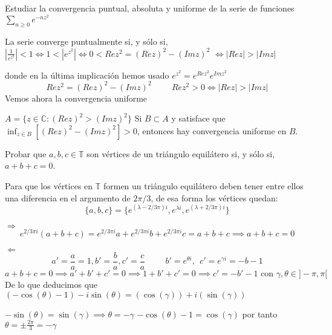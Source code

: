 \begin{ejer}
	Estudiar la convergencia puntual, absoluta y uniforme de la serie de funciones $\sum_{n\geq 0} e^{-nz^2}$
\end{ejer}

\begin{sol}
La serie converge puntualmente si, y sólo si, $| \frac{1}{e^{z^2}} | <1 \Longleftrightarrow 1<|e^{z^2}|  \Longleftrightarrow 0<Rez^2 = (Rez)^2-(Imz)^2 $
$\Longleftrightarrow |Rez| > |Imz|$

donde en la última implicación hemos usado
$e^{z^2} = e^{Rez^2} e^{Imz^2}$
$$Rez^2 = (Rez)^2 - (Imz)^2 \hspace{1cm}Rez^2>0 \Longleftrightarrow |Rez| > |Imz|$$
Vemos ahora la convergencia uniforme

$A = \{ z\in\mathbb{C} : (Rez)^2>(Imz)^2 \}$
Si $B\subset A$ y satisface que $\inf_{z\in B} [ (Rez)^2-(Imz)^2 ] > 0$, entonces hay convergencia uniforme en $B$.
\end{sol}



\begin{ejer}
	Probar que $a, b, c \in\mathbb{T}$ son vértices de un triángulo equilátero si, y sólo si, $a+b+c = 0$.
\end{ejer}

\begin{sol}
Para que los vértices en $\mathbb{T}$ formen un triángulo equilátero deben tener entre ellos una diferencia en el argumento de $2\pi/3$, de esa forma los vértices quedan:
$$\{ a,b,c \} = \{ e^{(\lambda - 2/3\pi)i}, e^{\lambda i}, e^{(\lambda + 2/3\pi)i} \}$$

$\Longrightarrow$
$$e^{2/3\pi i} (a+b+c) = e^{2/3\pi i} a + e^{2/3\pi i}b + e^{2/3\pi i}c = a+b+c \implies a+b+c=0$$

$\Longleftarrow$
$$a'=\frac{a}{a} = 1, b'=\frac{b}{a}, c'=\frac{c}{a} \hspace{1cm} b'=e^{\theta i} , \ \ c' = e^{\gamma i} = -b-1$$
$$a+b+c = 0 \implies a'+b'+c' = 0 \implies 1+b'+c' = 0 \implies c'=-b'-1 \text{ con }\gamma,\theta\in ]-\pi,\pi[$$
De lo que deducimos que 
$(-\cos(\theta)-1)-i\sin(\theta) = (\cos(\gamma)) + i(\sin(\gamma))$

$-\sin(\theta) = \sin(\gamma) \implies \theta = -\gamma $
$-\cos(\theta) -1 =  \cos(\gamma)$
por tanto
$\theta = \pm\frac{2\pi}{3} = -\gamma$

\end{sol}




